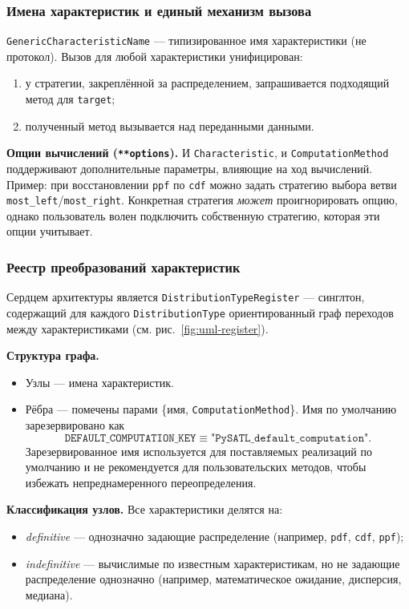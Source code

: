 \subsubsection{Имена характеристик и единый механизм вызова}

\texttt{GenericCharacteristicName} — типизированное имя характеристики (не протокол). Вызов для любой характеристики унифицирован:
\begin{enumerate}
  \item у стратегии, закреплённой за распределением, запрашивается подходящий метод для \texttt{target};
  \item полученный метод вызывается над переданными данными.
\end{enumerate}

\textbf{Опции вычислений (\texttt{\textbf{**options}}).}
И \texttt{Characteristic}, и \texttt{ComputationMethod} поддерживают дополнительные параметры, влияющие на ход вычислений. Пример: при восстановлении \texttt{ppf} по \texttt{cdf} можно задать стратегию выбора ветви \texttt{most\_left}/\texttt{most\_right}. Конкретная стратегия \emph{может} проигнорировать опцию, однако пользователь волен подключить собственную стратегию, которая эти опции учитывает.

\subsubsection{Реестр преобразований характеристик}
\label{subsec:registry}

Сердцем архитектуры является \texttt{DistributionTypeRegister} — синглтон, содержащий для каждого \texttt{DistributionType} ориентированный граф переходов между характеристиками (см. рис.~\ref{fig:uml-register}).

\textbf{Структура графа.}
\begin{itemize}
  \item Узлы — имена характеристик.
  \item Рёбра — помечены парами \{имя, \texttt{ComputationMethod}\}. Имя по умолчанию зарезервировано как
  \[
    \texttt{DEFAULT\_COMPUTATION\_KEY} \equiv \texttt{"PySATL\_default\_computation"}.
  \]
  Зарезервированное имя используется для поставляемых реализаций по умолчанию и не рекомендуется для пользовательских методов, чтобы избежать непреднамеренного переопределения.
\end{itemize}

\textbf{Классификация узлов.}
Все характеристики делятся на:
\begin{itemize}
  \item \emph{definitive} — однозначно задающие распределение (например, \texttt{pdf}, \texttt{cdf}, \texttt{ppf});
  \item \emph{indefinitive} — вычислимые по известным характеристикам, но не задающие распределение однозначно (например, математическое ожидание, дисперсия, медиана).
\end{itemize}

